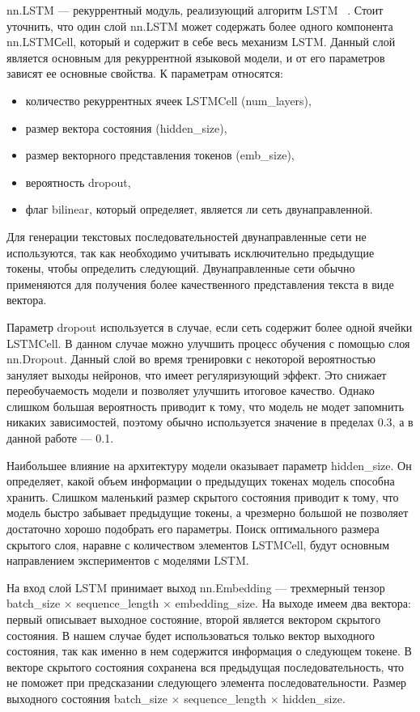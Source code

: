 nn.LSTM --- рекуррентный модуль, реализующий алгоритм LSTM ~\cite{lstm}. Стоит уточнить, что один слой nn.LSTM может содержать более одного компонента nn.LSTMСell, который и содержит в себе весь механизм LSTM. Данный слой является основным для рекуррентной языковой модели, и от его параметров зависят ее основные свойства. К параметрам относятся:
\begin{itemize}
	\item количество рекуррентных ячеек LSTMCell (num\_layers),
	\item размер вектора состояния (hidden\_size), 
	\item размер векторного представления токенов (emb\_size), 
	\item вероятность dropout, 
	\item флаг bilinear, который определяет, является ли сеть двунаправленной.
\end{itemize}

Для генерации текстовых последовательностей двунаправленные сети не используются, так как необходимо учитывать исключительно предыдущие токены, чтобы определить следующий. Двунаправленные сети обычно применяются для получения более качественного представления текста в виде вектора. 

Параметр dropout используется в случае, если сеть содержит более одной ячейки LSTMCell. В данном случае можно улучшить процесс обучения с помощью слоя nn.Dropout. Данный слой во время тренировки с некоторой вероятностью зануляет выходы нейронов, что имеет регуляризующий эффект. Это снижает переобучаемость модели и позволяет улучшить итоговое качество. Однако слишком большая вероятность приводит к тому, что модель не модет запомнить никаких зависимостей, поэтому обычно используется значение в пределах 0.3, а в данной работе --- 0.1.

Наибольшее влияние на архитектуру модели оказывает параметр hidden\_size. Он определяет, какой объем информации о предыдущих токенах модель способна хранить. Слишком маленький размер скрытого состояния приводит к тому, что модель быстро забывает предыдущие токены, а чрезмерно большой не позволяет достаточно хорошо подобрать его параметры. Поиск оптимального размера скрытого слоя, наравне с количеством элементов LSTMCell, будут основным направлением экспериментов с моделями LSTM.

На вход слой LSTM принимает выход nn.Embedding --- трехмерный тензор batch\_size $\times$ sequence\_length $\times$ embedding\_size. На выходе имеем два вектора: первый описывает выходное состояние, второй является вектором скрытого состояния. В нашем случае будет использоваться только вектор выходного состояния, так как именно в нем содержится информация о следующем токене. В векторе скрытого состояния сохранена вся предыдущая последовательность, что не поможет при предсказании следующего элемента последовательности. Размер выходного состояния batch\_size $\times$ sequence\_length $\times$ hidden\_size. 

